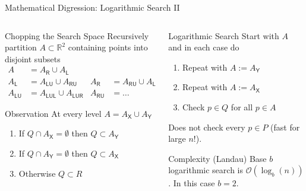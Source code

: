 \documentclass[xetex, handout]{beamer}
\begin{document}
\begin{frame}{Mathematical Digression: Logarithmic Search II}
  \begin{columns}
    \begin{column}{.6\linewidth}
      \begin{block}{Chopping the Search Space}
        Recursively partition $A \subset \mathbb{R}^2$ containing points into
        disjoint subsets
        \begin{align*}
          A &= A_\mathsf{R} \cup A_\mathsf{L}\\
          A_\mathsf{L} &= A_\mathsf{LU} \cup A_\mathsf{RU} &
          A_\mathsf{R} &= A_\mathsf{RU} \cup A_\mathsf{LU} \\
          A_\mathsf{LU} &= A_\mathsf{LUL} \cup A_\mathsf{LUR} & 
          A_\mathsf{RU} &= \ldots 
        \end{align*}
      \end{block}

      \begin{alertblock}{Observation}
        At every level $A = A_\mathsf{X}\cup A_\mathsf{Y}$
        \begin{enumerate}
          \item If $Q \cap A_\mathsf{X} = \emptyset$ then $Q \subset A_\mathsf{Y}$
          \item If $Q \cap A_\mathsf{Y} = \emptyset$ then $Q \subset A_\mathsf{X}$
          \item Otherwise $Q \subset R$
        \end{enumerate}
      \end{alertblock}
    \end{column}
    \begin{column}{.4\linewidth}
      \begin{alertblock}{Logarithmic Search}
        Start with $A$ and in each case do
        \begin{enumerate}
          \item Repeat with $A := A_\mathsf{Y}$
          \item Repeat with $A := A_\mathsf{X}$
          \item Check $p \in Q$ for all $p \in A$
        \end{enumerate}
        Does not check every $p \in P$ (fast for large $n$!).
      \end{alertblock}
      \begin{block}{Complexity (Landau)}
        Base $b$ logarithmic search is $\mathcal{O}(\log_b(n))$. In this case
        $b = 2$.
      \end{block}
    \end{column}
  \end{columns}
\end{frame}
\end{document}
